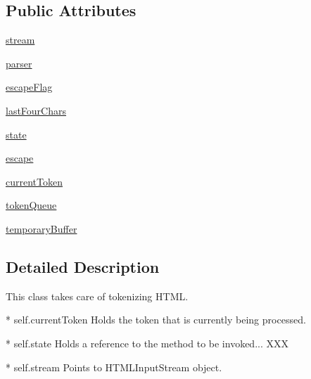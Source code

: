 \subsection*{Public Attributes}
\begin{DoxyCompactItemize}
\item 
\hyperlink{classpip_1_1__vendor_1_1html5lib_1_1__tokenizer_1_1HTMLTokenizer_a14fd3385f40bd47bb5ddfa797260198c}{stream}
\item 
\hyperlink{classpip_1_1__vendor_1_1html5lib_1_1__tokenizer_1_1HTMLTokenizer_a10008df5f350b336a2afe9394379592f}{parser}
\item 
\hyperlink{classpip_1_1__vendor_1_1html5lib_1_1__tokenizer_1_1HTMLTokenizer_a04c1dd6a27e707b6b74744e61fe009b3}{escape\+Flag}
\item 
\hyperlink{classpip_1_1__vendor_1_1html5lib_1_1__tokenizer_1_1HTMLTokenizer_a7b658629bf0bd488c10b85c8c12e2e6c}{last\+Four\+Chars}
\item 
\hyperlink{classpip_1_1__vendor_1_1html5lib_1_1__tokenizer_1_1HTMLTokenizer_a76811f1e1d86012c6f60879a95d3561c}{state}
\item 
\hyperlink{classpip_1_1__vendor_1_1html5lib_1_1__tokenizer_1_1HTMLTokenizer_ac0867b0423d5e62c4e63688178544e74}{escape}
\item 
\hyperlink{classpip_1_1__vendor_1_1html5lib_1_1__tokenizer_1_1HTMLTokenizer_ab87a113d35c0977e54c2029c092b9a29}{current\+Token}
\item 
\hyperlink{classpip_1_1__vendor_1_1html5lib_1_1__tokenizer_1_1HTMLTokenizer_a3f135816cc74990ced9141b178b47344}{token\+Queue}
\item 
\hyperlink{classpip_1_1__vendor_1_1html5lib_1_1__tokenizer_1_1HTMLTokenizer_a55d9699d611cef030b77596331e4fcca}{temporary\+Buffer}
\end{DoxyCompactItemize}


\subsection{Detailed Description}
\begin{DoxyVerb}This class takes care of tokenizing HTML.

* self.currentToken
  Holds the token that is currently being processed.

* self.state
  Holds a reference to the method to be invoked... XXX

* self.stream
  Points to HTMLInputStream object.
\end{DoxyVerb}
 

